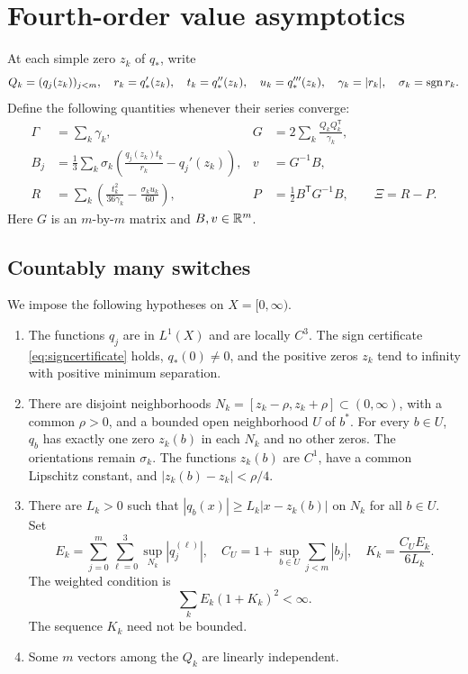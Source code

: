 \section{Fourth-order value asymptotics}\label{sec:general}
At each simple zero \(z_k\) of \(q_*\), write
\[
 Q_k=(q_j(z_k))_{j<m},\quad r_k=q_*'(z_k),\quad
 t_k=q_*''(z_k),\quad u_k=q_*'''(z_k),\quad
 \gamma_k=|r_k|,\quad \sigma_k=\operatorname{sgn} r_k.
\]
Define the following quantities whenever their series converge:
\begin{align}
 \Gamma&=\sum_k\gamma_k,&
 G&=2\sum_k\frac{Q_kQ_k^{\mathsf T}}{\gamma_k},\label{eq:GB}\\
 B_j&=\frac13\sum_k\sigma_k
       \left(\frac{q_j(z_k)t_k}{r_k}-q_j'(z_k)\right),&
 v&=G^{-1}B,\nonumber\\
 R&=\sum_k\left(\frac{t_k^2}{36\gamma_k}
                    -\frac{\sigma_ku_k}{60}\right),&
 P&=\frac12B^{\mathsf T}G^{-1}B,\qquad \Xi=R-P.\label{eq:RP}
\end{align}
Here \(G\) is an \(m\)-by-\(m\) matrix and \(B,v\in\mathbb R^m\).

\subsection{Countably many switches}
We impose the following hypotheses on \(X=[0,\infty)\).
\begin{enumerate}[label=(H\arabic*),leftmargin=*]
\item The functions \(q_j\) are in \(L^1(X)\) and are locally \(C^3\).
The sign certificate \eqref{eq:signcertificate} holds, \(q_*(0)\ne0\), and
the positive zeros \(z_k\) tend to infinity with positive minimum separation.
\item There are disjoint neighborhoods \(N_k=[z_k-\rho,z_k+\rho]\subset(0,\infty)\),
with a common \(\rho>0\), and a bounded open neighborhood \(U\) of \(b^*\).
For every \(b\in U\), \(q_b\) has exactly one zero \(z_k(b)\) in each \(N_k\)
and no other zeros. The orientations remain \(\sigma_k\).
The functions \(z_k(b)\) are \(C^1\), have a common Lipschitz constant, and
\(|z_k(b)-z_k|<\rho/4\).
\item There are \(L_k>0\) such that
\(|q_b(x)|\geq L_k|x-z_k(b)|\) on \(N_k\) for all \(b\in U\).
Set
\[
 E_k=\sum_{j=0}^m\sum_{\ell=0}^3\sup_{N_k}|q_j^{(\ell)}|,
 \quad C_U=1+\sup_{b\in U}\sum_{j<m}|b_j|,
 \quad K_k=\frac{C_UE_k}{6L_k}.
\]
The weighted condition is
\begin{equation}\label{eq:weighted}
 \sum_kE_k(1+K_k)^2<\infty.
\end{equation}
The sequence \(K_k\) need not be bounded.
\item Some \(m\) vectors among the \(Q_k\) are linearly independent.
\end{enumerate}

